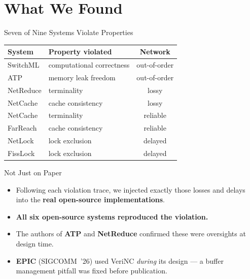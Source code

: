 \section{What We Found}

\begin{frame}{Seven of Nine Systems Violate Properties}
  \begin{center}
    \footnotesize
    \renewcommand{\arraystretch}{0.95}
    \begin{tabular}{@{}llc@{}}
      \toprule
      \textbf{System} & \textbf{Property violated} & \textbf{Network} \\
      \midrule
      SwitchML  & computational correctness & out-of-order \\
      ATP       & memory leak freedom       & out-of-order \\
      NetReduce & terminality               & lossy \\
      \addlinespace[0.45em]
      NetCache  & cache consistency & lossy \\
      NetCache  & terminality       & reliable \\
      FarReach  & cache consistency & reliable \\
      \addlinespace[0.45em]
      NetLock   & lock exclusion & delayed \\
      FissLock  & lock exclusion & delayed \\
      \bottomrule
    \end{tabular}
  \end{center}
  \vspace{0.7em}
  \begin{center}
    \begin{minipage}{0.94\textwidth}
      \centering
    \end{minipage}
  \end{center}
\end{frame}

\begin{frame}{Not Just on Paper}
  \vspace{0.5em}
  \begin{itemize}
    \item Following each violation trace, we injected exactly those losses
          and delays into the \textbf{real open-source implementations}.
    \vspace{0.7em}
    \item<2-> \textbf{All six open-source systems reproduced the violation.}
    \vspace{0.7em}
    \item<3-> The authors of \textbf{ATP} and \textbf{NetReduce} confirmed these
          were oversights at design time.
    \vspace{0.7em}
    \item<4-> \textbf{EPIC} (SIGCOMM~'26) used VeriNC \emph{during} its design ---
          a buffer management pitfall was fixed before publication.
  \end{itemize}
\end{frame}

